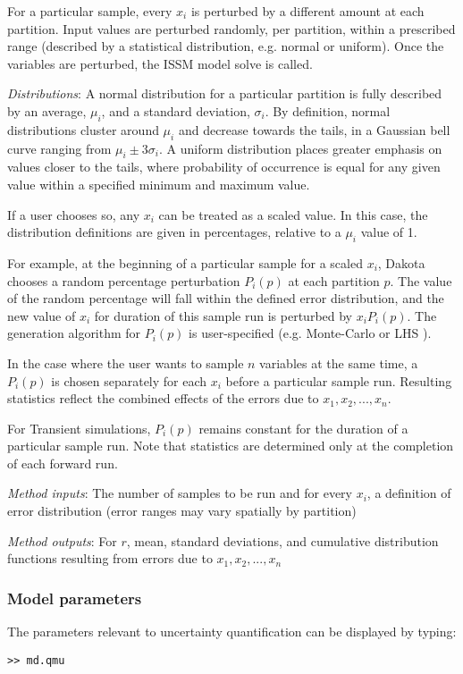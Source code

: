 For a particular sample, every $x_i$ is perturbed by a different amount at each partition. Input values are perturbed randomly, per partition, within a prescribed range (described by a statistical distribution, e.g. normal or uniform). Once the variables are perturbed, the ISSM model solve is called.

\emph{Distributions}: A normal distribution for a particular partition is fully described by an average, $\mu_i$, and a standard deviation, $\sigma_i$. By definition, normal distributions cluster around $\mu_i$ and decrease towards the tails, in a Gaussian bell curve ranging from $\mu_i\pm 3\sigma_i$. A uniform distribution places greater emphasis on values closer to the tails, where probability of occurrence is equal for any given value within a specified minimum and maximum value.

If a user chooses so, any $x_i$ can be treated as a scaled value. In this case, the distribution definitions are given in percentages, relative to a $\mu_i$ value of 1.

For example, at the beginning of a particular sample for a scaled $x_i$, Dakota chooses a random percentage perturbation $P_i(p)$ at each partition $p$. The value of the random percentage will fall within the defined error distribution, and the new value of $x_i$ for duration of this sample run is perturbed by $x_iP_i(p)$. The generation algorithm for $P_i(p)$ is user-specified (e.g. Monte-Carlo or LHS \citep{Swiler2004}).

In the case where the user wants to sample $n$ variables at the same time, a $P_i(p)$ is chosen separately for each $x_i$ before a particular sample run. Resulting statistics reflect the combined effects of the errors due to $x_1,x_2,...,x_n$.

For Transient simulations, $P_i(p)$ remains constant for the duration of a particular sample run. Note that statistics are determined only at the completion of each forward run.

\emph{Method inputs}: The number of samples to be run and for every $x_i$, a definition of error distribution (error ranges may vary spatially by partition)

\emph{Method outputs}: For $r$, mean, standard deviations, and cumulative distribution functions resulting from errors due to $x_1,x_2,...,x_n$

\subsubsection{Model parameters}
The parameters relevant to uncertainty quantification can be displayed by typing:
\begin{lstlisting}
>> md.qmu
\end{lstlisting}

